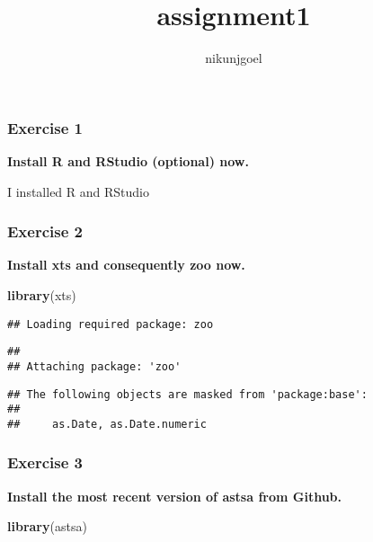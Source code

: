 \documentclass[
]{article}
\title{assignment1}
\author{nikunjgoel}
\date{}
\newenvironment{Shaded}{\begin{snugshade}}{\end{snugshade}}
\newcommand{\KeywordTok}[1]{\textcolor[rgb]{0.13,0.29,0.53}{\textbf{#1}}}
\newcommand{\NormalTok}[1]{#1}
\begin{document}
\maketitle

\hypertarget{exercise-1}{%
\subsubsection{Exercise 1}\label{exercise-1}}

\textbf{Install R and RStudio (optional) now.}

I installed R and RStudio

\hypertarget{exercise-2}{%
\subsubsection{Exercise 2}\label{exercise-2}}

\textbf{Install xts and consequently zoo now.}

\begin{Shaded}
\begin{Highlighting}[]
\KeywordTok{library}\NormalTok{(xts)}
\end{Highlighting}
\end{Shaded}

\begin{verbatim}
## Loading required package: zoo
\end{verbatim}

\begin{verbatim}
## 
## Attaching package: 'zoo'
\end{verbatim}

\begin{verbatim}
## The following objects are masked from 'package:base':
## 
##     as.Date, as.Date.numeric
\end{verbatim}

\hypertarget{exercise-3}{%
\subsubsection{Exercise 3}\label{exercise-3}}

\textbf{Install the most recent version of astsa from Github.}

\begin{Shaded}
\begin{Highlighting}[]
\KeywordTok{library}\NormalTok{(astsa)}
\end{Highlighting}
\end{Shaded}
\end{document}
